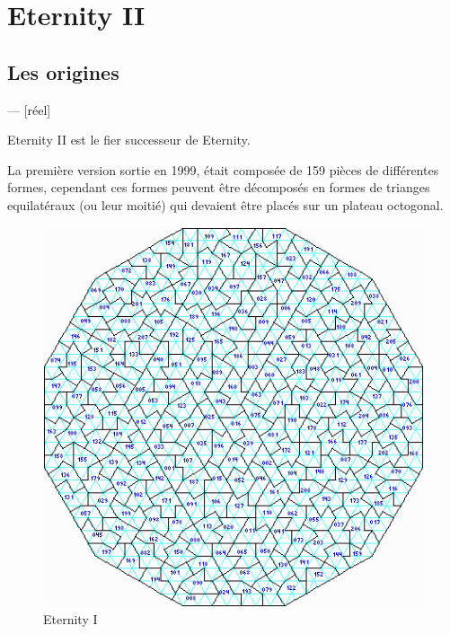 \section{Eternity II}
	\subsection{Les origines}
	--- [réel]
	
	Eternity II est le fier successeur de Eternity.
	
	La première version sortie en 1999, était composée de 159 pièces de différentes formes, cependant ces formes peuvent être décomposés en formes de trianges equilatéraux (ou leur moitié) qui devaient être placés sur un plateau octogonal. 
	
	\begin{figure}[H]
		\includegraphics[width=\linewidth]{images/eternity_1.jpg}
		\caption{Eternity I}\label{fig:eternity_1}
		\endminipage\hfill

\end{figure}

